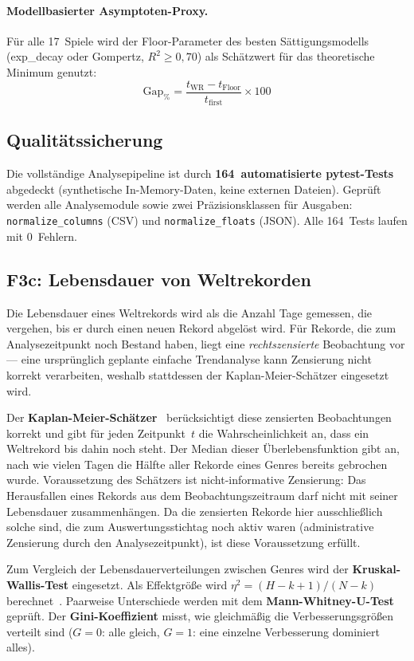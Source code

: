 \paragraph{Modellbasierter Asymptoten-Proxy.} Für alle 17~Spiele wird der Floor-Parameter des besten Sättigungsmodells (exp\_decay oder Gompertz, $R^2 \geq 0{,}70$) als Schätzwert für das theoretische Minimum genutzt:
\[
    \mathrm{Gap}_{\%} = \frac{t_{\mathrm{WR}} - t_{\mathrm{Floor}}}{t_{\mathrm{first}}} \times 100
\]

\subsection*{Qualitätssicherung}

Die vollständige Analysepipeline ist durch \textbf{164~automatisierte pytest-Tests} abgedeckt (synthetische In-Memory-Daten, keine externen Dateien). Geprüft werden alle Analysemodule sowie zwei Präzisionsklassen für Ausgaben: \texttt{normalize\_columns} (CSV) und \texttt{normalize\_floats} (JSON). Alle 164~Tests laufen mit 0~Fehlern.

\subsection*{F3c: Lebensdauer von Weltrekorden}

Die Lebensdauer eines Weltrekords wird als die Anzahl Tage gemessen, die vergehen, bis er durch einen neuen Rekord abgelöst wird. Für Rekorde, die zum Analysezeitpunkt noch Bestand haben, liegt eine \emph{rechtszensierte} Beobachtung vor --- eine ursprünglich geplante einfache Trendanalyse kann Zensierung nicht korrekt verarbeiten, weshalb stattdessen der Kaplan-Meier-Schätzer eingesetzt wird.

Der \textbf{Kaplan-Meier-Schätzer}~\cite{darrigo2021} berücksichtigt diese zensierten Beobachtungen korrekt und gibt für jeden Zeitpunkt~$t$ die Wahrscheinlichkeit an, dass ein Weltrekord bis dahin noch steht. Der Median dieser Überlebensfunktion gibt an, nach wie vielen Tagen die Hälfte aller Rekorde eines Genres bereits gebrochen wurde. Voraussetzung des Schätzers ist nicht-informative Zensierung: Das Herausfallen eines Rekords aus dem Beobachtungszeitraum darf nicht mit seiner Lebensdauer zusammenhängen. Da die zensierten Rekorde hier ausschließlich solche sind, die zum Auswertungsstichtag noch aktiv waren (administrative Zensierung durch den Analysezeitpunkt), ist diese Voraussetzung erfüllt.

Zum Vergleich der Lebensdauerverteilungen zwischen Genres wird der \textbf{Kruskal-Wallis-Test} eingesetzt. Als Effektgröße wird $\eta^2 = (H - k + 1)/(N - k)$ berechnet~\cite{tomczak2014}. Paarweise Unterschiede werden mit dem \textbf{Mann-Whitney-U-Test}~\cite{kim2016} geprüft. Der \textbf{Gini-Koeffizient} misst, wie gleichmäßig die Verbesserungsgrößen verteilt sind ($G = 0$: alle gleich, $G = 1$: eine einzelne Verbesserung dominiert alles).
